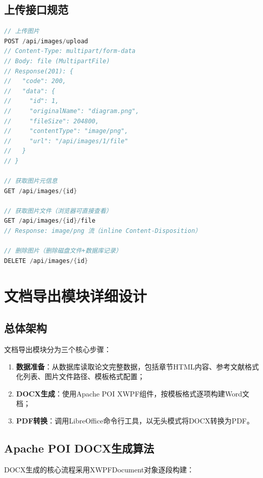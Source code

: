 \documentclass{../../softeng}
\begin{document}
\subsection{上传接口规范}

\begin{lstlisting}[language=Java,caption={ImageController 上传与访问接口}]
// 上传图片
POST /api/images/upload
// Content-Type: multipart/form-data
// Body: file (MultipartFile)
// Response(201): {
//   "code": 200,
//   "data": {
//     "id": 1,
//     "originalName": "diagram.png",
//     "fileSize": 204800,
//     "contentType": "image/png",
//     "url": "/api/images/1/file"
//   }
// }

// 获取图片元信息
GET /api/images/{id}

// 获取图片文件（浏览器可直接查看）
GET /api/images/{id}/file
// Response: image/png 流（inline Content-Disposition）

// 删除图片（删除磁盘文件+数据库记录）
DELETE /api/images/{id}
\end{lstlisting}

\section{文档导出模块详细设计}

\subsection{总体架构}

文档导出模块分为三个核心步骤：
\begin{enumerate}
    \item \textbf{数据准备}：从数据库读取论文完整数据，包括章节HTML内容、参考文献格式化列表、图片文件路径、模板格式配置；
    \item \textbf{DOCX生成}：使用Apache POI XWPF组件，按模板格式逐项构建Word文档；
    \item \textbf{PDF转换}：调用LibreOffice命令行工具，以无头模式将DOCX转换为PDF。
\end{enumerate}

\subsection{Apache POI DOCX生成算法}

DOCX生成的核心流程采用XWPFDocument对象逐段构建：
\end{document}

